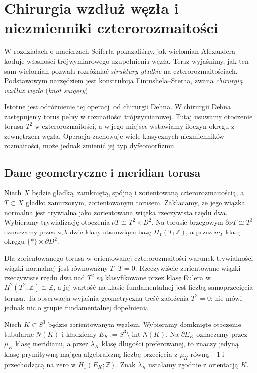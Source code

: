 \chapter{Chirurgia wzdłuż węzła i niezmienniki czterorozmaitości}
\label{ch:tg-knot-surgery}

W rozdziałach o macierzach Seiferta pokazaliśmy, jak wielomian
Alexandera koduje własności trójwymiarowego uzupełnienia węzła.
Teraz wyjaśnimy, jak ten sam wielomian pozwala rozróżniać
\emph{struktury gładkie} na czterorozmaitościach. Podstawowym
narzędziem jest konstrukcja Fintushela--Sterna, zwana
\emph{chirurgią wzdłuż węzła} (\emph{knot surgery}).

Istotne jest odróżnienie tej operacji od chirurgii Dehna.
W chirurgii Dehna zastępujemy torus pełny w rozmaitości
trójwymiarowej. Tutaj usuwamy otoczenie torusa $T^2$ w
czterorozmaitości, a w jego miejsce wstawiamy iloczyn okręgu
z zewnętrzem węzła. Operacja zachowuje wiele klasycznych
niezmienników rozmaitości, może jednak zmienić jej typ
dyfeomorfizmu.

\section{Dane geometryczne i meridian torusa}
\label{sec:tg-ks-data}

\begin{definicja}
Niech $X$ będzie gładką, zamkniętą, spójną i zorientowaną
czterorozmaitością, a $T\subset X$ gładko zanurzonym,
zorientowanym torusem. Zakładamy, że jego wiązka normalna
jest trywialna jako zorientowana wiązka rzeczywista
rzędu dwa. Wybieramy trywializację otoczenia
$\nu T\cong T^2\times D^2$. Na torusie brzegowym
$\partial\nu T\cong T^3$ oznaczamy przez $a,b$ dwie
klasy stanowiące bazę $H_1(T;\mathbb Z)$, a przez
$m_T$ klasę okręgu $\{*\}\times\partial D^2$.
\end{definicja}

Dla zorientowanego torusa w orientowanej czterorozmaitości
warunek trywialności wiązki normalnej jest równoważny
$T\cdot T=0$. Rzeczywiście zorientowane wiązki
rzeczywiste rzędu dwa nad $T^2$ są klasyfikowane
przez klasę Eulera w $H^2(T^2;\mathbb Z)\cong\mathbb Z$,
a jej wartość na klasie fundamentalnej jest
liczbą samoprzecięcia torusa. Ta obserwacja
wyjaśnia geometryczną treść założenia $T^2=0$;
nie mówi jednak nic o grupie fundamentalnej dopełnienia.

\begin{definicja}
Niech $K\subset S^3$ będzie zorientowanym węzłem.
Wybieramy domknięte otoczenie tubularne $N(K)$ i kładziemy
$E_K:=S^3\setminus\operatorname{int}N(K)$.
Na $\partial E_K$ oznaczamy przez $\mu_K$ klasę
meridianu, a przez $\lambda_K$ klasę długości
preferowanej, to znaczy jedyną klasę prymitywną
mającą algebraiczną liczbę przecięcia z $\mu_K$
równą $\pm1$ i przechodzącą na zero w
$H_1(E_K;\mathbb Z)$. Znak $\lambda_K$ ustalamy
zgodnie z orientacją $K$.
\end{definicja}

